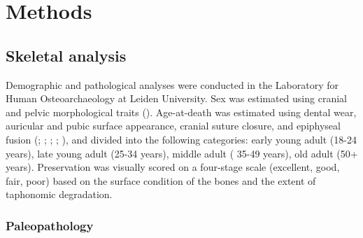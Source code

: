 \documentclass[
  11pt,
  leqno]{scrartcl}
\begin{document}
\section{Methods}\label{methods}

\subsection{Skeletal analysis}\label{skeletal-analysis}

Demographic and pathological analyses were conducted in the Laboratory
for Human Osteoarchaeology at Leiden University. Sex was estimated using
cranial and pelvic morphological traits
(). Age-at-death
was estimated using dental wear, auricular and pubic surface appearance,
cranial suture closure, and epiphyseal fusion
(;
;
;
;
),
and divided into the following categories: early young adult (18-24
years), late young adult (25-34 years), middle adult ( 35-49 years), old
adult (50+ years). Preservation was visually scored on a four-stage
scale (excellent, good, fair, poor) based on the surface condition of
the bones and the extent of taphonomic degradation.

\subsubsection{Paleopathology}\label{paleopathology}
\end{document}
